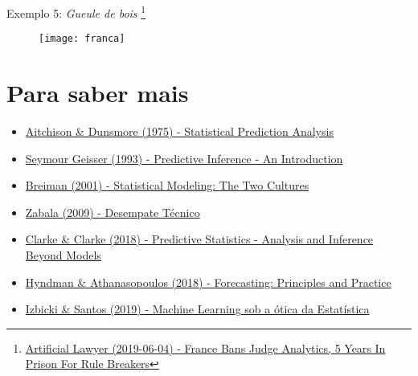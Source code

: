 \documentclass{beamer}
\newcommand\blfootnote[1]{%
  \begingroup
  \renewcommand\thefootnote{}\footnote{#1}%
  \addtocounter{footnote}{-1}%
  \endgroup
}
\begin{document}
\begin{frame}{Exemplo 5: \textit{Gueule de bois}}
\blfootnote{\tiny{\href{https://www.artificiallawyer.com/2019/06/04/france-bans-judge-analytics-5-years-in-prison-for-rule-breakers/}{Artificial Lawyer (2019-06-04) - France Bans Judge Analytics, 5 Years In Prison For Rule Breakers}}}
\begin{figure}
\texttt{[image: franca]}
\end{figure}
\end{frame}

\section{Para saber mais}
\begin{frame}{\secname}
    	\begin{itemize}
    	\item \href{https://doi.org/10.1017/CBO9780511569647}{Aitchison \& Dunsmore (1975) - Statistical Prediction Analysis}
    	\item \href{https://doi.org/10.1201/9780203742310}{Seymour Geisser (1993) - Predictive Inference - An Introduction}
    	\item \href{https://projecteuclid.org/euclid.ss/1009213726}{Breiman (2001) - Statistical Modeling: The Two Cultures}
    	\item \href{http://www.filipezabala.com/artigos/zabala2009desempate.pdf}{Zabala (2009) - Desempate Técnico}
    	\item \href{https://doi.org/10.1017/9781139236003}{Clarke \& Clarke (2018) - Predictive Statistics - Analysis and Inference Beyond Models}
    	\item \href{https://otexts.com/fpp2/}{Hyndman \& Athanasopoulos (2018) - Forecasting: Principles and Practice}
    	\item \href{http://www.rizbicki.ufscar.br/sml.pdf}{Izbicki \& Santos (2019) - Machine Learning sob a ótica da Estatística}
	\end{itemize}
\end{frame}
\end{document}
